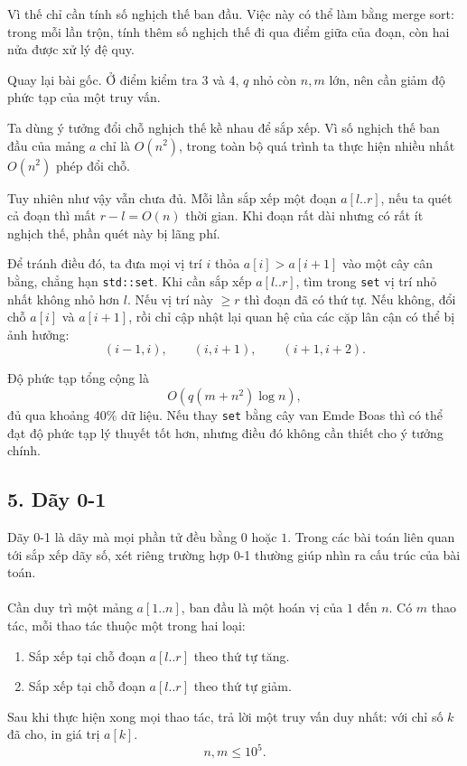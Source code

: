 \documentclass[11pt]{article}
\begin{document}
Vì thế chỉ cần tính số nghịch thế ban đầu. Việc này có thể làm bằng merge
sort: trong mỗi lần trộn, tính thêm số nghịch thế đi qua điểm giữa của đoạn,
còn hai nửa được xử lý đệ quy.

Quay lại bài gốc. Ở điểm kiểm tra 3 và 4, \(q\) nhỏ còn \(n,m\) lớn, nên cần
giảm độ phức tạp của một truy vấn.

Ta dùng ý tưởng đổi chỗ nghịch thế kề nhau để sắp xếp. Vì số nghịch thế ban
đầu của mảng \(a\) chỉ là \(O(n^2)\), trong toàn bộ quá trình ta thực hiện
nhiều nhất \(O(n^2)\) phép đổi chỗ.

Tuy nhiên như vậy vẫn chưa đủ. Mỗi lần sắp xếp một đoạn \(a[l..r]\), nếu ta
quét cả đoạn thì mất \(r-l=O(n)\) thời gian. Khi đoạn rất dài nhưng có rất ít
nghịch thế, phần quét này bị lãng phí.

Để tránh điều đó, ta đưa mọi vị trí \(i\) thỏa \(a[i]>a[i+1]\) vào một cây cân
bằng, chẳng hạn \texttt{std::set}. Khi cần sắp xếp \(a[l..r]\), tìm trong
\texttt{set} vị trí nhỏ nhất không nhỏ hơn \(l\). Nếu vị trí này \(\ge r\) thì
đoạn đã có thứ tự. Nếu không, đổi chỗ \(a[i]\) và \(a[i+1]\), rồi chỉ cập nhật
lại quan hệ của các cặp lân cận có thể bị ảnh hưởng:
\[
  (i-1,i),\qquad (i,i+1),\qquad (i+1,i+2).
\]

Độ phức tạp tổng cộng là
\[
  O(q(m+n^2)\log n),
\]
đủ qua khoảng 40\% dữ liệu. Nếu thay \texttt{set} bằng cây van Emde Boas thì
có thể đạt độ phức tạp lý thuyết tốt hơn, nhưng điều đó không cần thiết cho
ý tưởng chính.

\subsection*{5. Dãy 0-1}

Dãy 0-1 là dãy mà mọi phần tử đều bằng \(0\) hoặc \(1\). Trong các bài toán
liên quan tới sắp xếp dãy số, xét riêng trường hợp 0-1 thường giúp nhìn ra
cấu trúc của bài toán.

\paragraph{}
Cần duy trì một mảng \(a[1..n]\), ban đầu là một hoán vị của \(1\) đến \(n\).
Có \(m\) thao tác, mỗi thao tác thuộc một trong hai loại:
\begin{enumerate}
  \item Sắp xếp tại chỗ đoạn \(a[l..r]\) theo thứ tự tăng.
  \item Sắp xếp tại chỗ đoạn \(a[l..r]\) theo thứ tự giảm.
\end{enumerate}
Sau khi thực hiện xong mọi thao tác, trả lời một truy vấn duy nhất: với chỉ số
\(k\) đã cho, in giá trị \(a[k]\).
\[
  n,m\le 10^5.
\]
\end{document}
